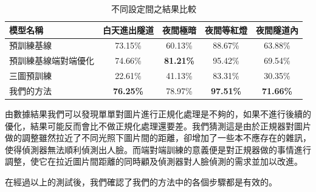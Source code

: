 \begin{table}[ht]
    \caption{不同設定間之結果比較}
    \centering
    \begin{tabular}{l c c c c}
        \hline
        模型名稱 & 白天進出隧道 & 夜間極暗 & 夜間等紅燈 & 夜間隧道內 \\
        \hline
        預訓練基線 & 73.15\% & 60.13\% & 88.67\% & 63.88\% \\
        預訓練基線端對端優化 & 74.66\% & \textbf{81.21\%} &95.42\% & 69.54\% \\
        \hline
        三圖預訓練 & 22.61\% & 41.13\% & 83.31\% & 30.35\% \\
        我們的方法 & \textbf{76.25\%} & 78.97\% & \textbf{97.51\%} & \textbf{71.66\%} \\
        \hline
    \end{tabular}
    \label{table:optimize_compare}
\end{table}

由數據結果我們可以發現單單對圖片進行正規化處理是不夠的，如果不進行後續的優化，結果可能反而會比不做正規化處理還要差。我們猜測這是由於正規器對圖片做的調整雖然拉近了不同光照下圖片間的距離，卻增加了一些本不應存在的雜訊，使得偵測器無法順利偵測出人臉。而端對端訓練的意義便是對正規器做的事情進行調整，使它在拉近圖片間距離的同時顧及偵測器對人臉偵測的需求並加以改進。

在經過以上的測試後，我們確認了我們的方法中的各個步驟都是有效的。